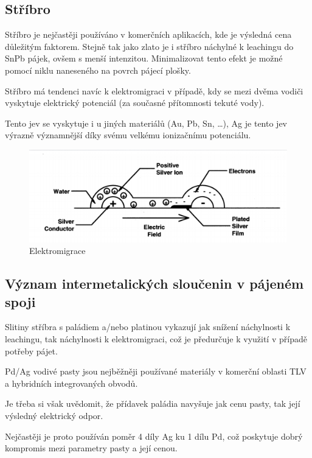 \subsection{Stříbro}
Stříbro je nejčastěji používáno v komerčních aplikacích, kde je výsledná cena důležitým faktorem. Stejně tak jako zlato je i stříbro náchylné k leachingu do SnPb pájek, ovšem s menší intenzitou. Minimalizovat tento efekt je možné pomocí niklu naneseného na povrch pájecí plošky.

Stříbro má tendenci navíc k elektromigraci v případě, kdy se mezi dvěma vodiči vyskytuje elektrický potenciál (za současné přítomnosti tekuté vody).

Tento jev se vyskytuje i u jiných materiálů (Au, Pb, Sn, …), Ag je tento jev výrazně
významnější díky svému velkému ionizačnímu potenciálu.

\begin{figure}[h]
   \begin{center}
     \includegraphics[scale=0.6]{images/Migrace.png}
   \end{center}
   \caption{Elektromigrace}
\end{figure}

\subsection{Význam intermetalických sloučenin v pájeném spoji}
Slitiny stříbra s paládiem a/nebo platinou vykazují jak snížení náchylnosti k leachingu, tak
náchylnosti k elektromigraci, což je předurčuje k využití v případě potřeby pájet.

Pd/Ag vodivé pasty jsou nejběžněji používané materiály v komerční oblasti TLV a hybridních
integrovaných obvodů.

Je třeba si však uvědomit, že přídavek paládia navyšuje jak cenu pasty, tak její výsledný
elektrický odpor.

Nejčastěji je proto používán poměr 4 díly Ag ku 1 dílu Pd, což poskytuje dobrý kompromis mezi
parametry pasty a její cenou.


















